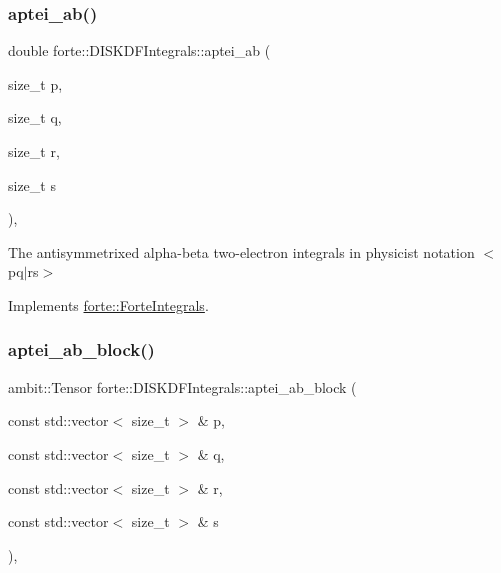 \subsubsection{\texorpdfstring{aptei\+\_\+ab()}{aptei\_ab()}}
{\footnotesize\ttfamily double forte\+::\+D\+I\+S\+K\+D\+F\+Integrals\+::aptei\+\_\+ab (\begin{DoxyParamCaption}\item[{size\+\_\+t}]{p,  }\item[{size\+\_\+t}]{q,  }\item[{size\+\_\+t}]{r,  }\item[{size\+\_\+t}]{s }\end{DoxyParamCaption})\hspace{0.3cm}{\ttfamily [override]}, {\ttfamily [virtual]}}



The antisymmetrixed alpha-\/beta two-\/electron integrals in physicist notation $<$pq$\vert$rs$>$ 



Implements \mbox{\hyperlink{classforte_1_1_forte_integrals_a45efc2329cdfc7e4690cbe85688b947e}{forte\+::\+Forte\+Integrals}}.

\mbox{\label{classforte_1_1_d_i_s_k_d_f_integrals_a3512219937aa98d2f0b6ee680254317a}} 
\subsubsection{\texorpdfstring{aptei\+\_\+ab\+\_\+block()}{aptei\_ab\_block()}}
{\footnotesize\ttfamily ambit\+::\+Tensor forte\+::\+D\+I\+S\+K\+D\+F\+Integrals\+::aptei\+\_\+ab\+\_\+block (\begin{DoxyParamCaption}\item[{const std\+::vector$<$ size\+\_\+t $>$ \&}]{p,  }\item[{const std\+::vector$<$ size\+\_\+t $>$ \&}]{q,  }\item[{const std\+::vector$<$ size\+\_\+t $>$ \&}]{r,  }\item[{const std\+::vector$<$ size\+\_\+t $>$ \&}]{s }\end{DoxyParamCaption})\hspace{0.3cm}{\ttfamily [override]}, {\ttfamily [virtual]}}



